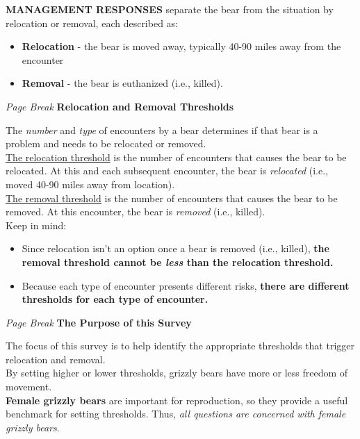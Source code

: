 \documentclass[english,12pt]{article}
\begin{document}
\textbf{MANAGEMENT RESPONSES} separate the bear from the situation by relocation or removal, each described as:
\begin{itemize}
    \item \textbf{Relocation} - the bear is moved away, typically 40-90 miles away from the encounter
    \item \textbf{Removal} - the bear is euthanized (i.e., killed).
\end{itemize}
\textit{Page Break}
\newpage
\textbf{Relocation and Removal Thresholds}

The \textit{number} and \textit{type} of encounters by a bear determines if that bear is a problem and needs to be relocated or removed.\\

\underline{The relocation threshold} is the number of encounters that causes the bear to be relocated. At this and each subsequent encounter, the bear is \textit{relocated} (i.e., moved 40-90 miles away from location).\\

\underline{The removal threshold} is the number of encounters that causes the bear to be removed. At this encounter, the bear is \textit{removed} (i.e., killed).\\

Keep in mind:
\begin{itemize}
    \item Since relocation isn't an option once a bear is removed (i.e., killed), \textbf{the removal threshold cannot be \textit{less} than the relocation threshold.}
    \item Because each type of encounter presents different risks, \textbf{there are different thresholds for each type of encounter.}
\end{itemize}
\textit{Page Break}
\newpage
\textbf{The Purpose of this Survey}

The focus of this survey is to help identify the appropriate thresholds that trigger relocation and removal.\\

By setting higher or lower thresholds, grizzly bears have more or less freedom of movement.\\

\textbf{Female grizzly bears} are important for reproduction, so they provide a useful benchmark for setting thresholds. Thus, \textit{all questions are concerned with female grizzly bears}.\\ 
\end{document}
